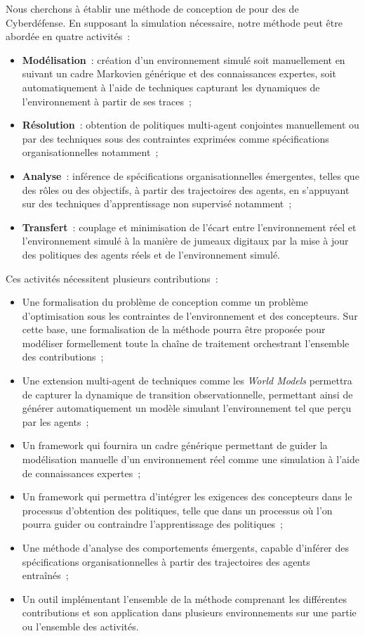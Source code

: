 \noindent
Nous cherchons à établir une méthode de conception de  pour des  de Cyberdéfense. En supposant la simulation nécessaire, notre méthode peut être abordée en quatre activités~:
\begin{itemize}
  \item \textbf{Modélisation}~: création d'un environnement simulé soit manuellement en suivant un cadre Markovien générique et des connaissances expertes, soit automatiquement à l'aide de techniques  capturant les dynamiques de l'environnement à partir de ses traces~;
  \item \textbf{Résolution}~: obtention de politiques multi-agent conjointes manuellement ou par des techniques  sous des contraintes exprimées comme spécifications organisationnelles notamment~;
  \item \textbf{Analyse}~: inférence de spécifications organisationnelles émergentes, telles que des rôles ou des objectifs, à partir des trajectoires des agents, en s'appuyant sur des techniques d'apprentissage non supervisé notamment~;
  \item \textbf{Transfert}~: couplage et minimisation de l'écart entre l'environnement réel et l'environnement simulé à la manière de jumeaux digitaux par la mise à jour des politiques des agents réels et de l'environnement simulé.
\end{itemize}



\noindent Ces activités nécessitent plusieurs contributions~:
\begin{itemize}
  \item Une formalisation du problème de conception comme un problème d'optimisation sous les contraintes de l'environnement et des concepteurs. Sur cette base, une formalisation de la méthode pourra être proposée pour modéliser formellement toute la chaîne de traitement orchestrant l'ensemble des contributions~;
  \item Une extension multi-agent de techniques  comme les \textit{World Models} permettra de capturer la dynamique de transition observationnelle, permettant ainsi de générer automatiquement un modèle simulant l'environnement tel que perçu par les agents~;
  \item Un framework qui fournira un cadre générique permettant de guider la modélisation manuelle d'un environnement réel comme une simulation à l'aide de connaissances expertes~;
  \item Un framework qui permettra d'intégrer les exigences des concepteurs dans le processus d'obtention des politiques, telle que dans un processus  où l'on pourra guider ou contraindre l'apprentissage des politiques~;
  \item Une méthode d'analyse des comportements émergents, capable d'inférer des spécifications organisationnelles à partir des trajectoires des agents entraînés~;
  \item Un outil implémentant l'ensemble de la méthode comprenant les différentes contributions et son application dans plusieurs environnements sur une partie ou l'ensemble des activités.
\end{itemize}

